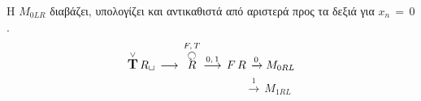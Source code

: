 \par Η $M_{0LR}$ διαβάζει, υπολογίζει και αντικαθιστά από αριστερά προς τα δεξιά για $x_n\,=\,0$.
\reducevspace\reducevspace\reducevspace\reducevspace\reducevspace\reducevspace\reducevspace\reducevspace\reducevspace
\reducevspace\reducevspace\reducevspace\reducevspace\reducevspace\reducevspace\reducevspace\reducevspace\reducevspace
\[\overset{\lor}{{\text{\large\bfseries T}}}\,R_\sqcup\, \longrightarrow\,
\overset{F,\,T}{\overset{\botcircleleft}{R}}
\overset{0,\,1}{\longrightarrow}\,
F\,R\,\xrightarrow{0} M_{0RL}\]
\reducevspace\reducevspace\reducevspace\reducevspace\reducevspace\reducevspace\reducevspace
\reducevspace\reducevspace\reducevspace\reducevspace\reducevspace\reducevspace\reducevspace
\reducevspace\reducevspace\reducevspace\reducevspace\reducevspace\reducevspace\reducevspace
\reducevspace\reducevspace\reducevspace\reducevspace\reducevspace\reducevspace\reducevspace
\[\qquad\qquad\qquad\qquad\quad\;\;\;\,\xrightarrow{1}\, M_{1RL}\]

